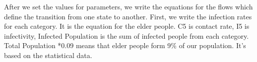 After we set the values for parameters, we write the equations for the flows which define the transition from one state to another. First, we write the infection rates for each category. It is the equation for the elder people. C5 is contact rate, I5 is infectivity, Infected Population is the sum of infected people from each category.  Total Population *0.09 means that elder people form 9\% of our population. It’s based on the statistical data.

